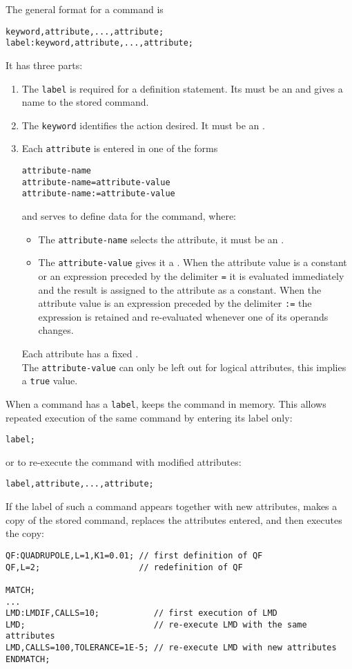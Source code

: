 The general format for a command is
\begin{verbatim}
keyword,attribute,...,attribute;
label:keyword,attribute,...,attribute;
\end{verbatim}
It has three parts:
\begin{enumerate}
\item The \texttt{label} is required for a definition statement.
  Its must be an  and gives a name to the
  stored command. 
\item The \texttt{keyword} identifies the action desired.
  It must be an .
\item Each \texttt{attribute} is entered in one of the forms
\begin{verbatim}
attribute-name
attribute-name=attribute-value
attribute-name:=attribute-value
\end{verbatim}
and serves to define data for the command, where:
\begin{itemize}
\item The \texttt{attribute-name} selects the attribute,
  it must be an .
\item The \texttt{attribute-value} gives it a .
  When the attribute value is a constant or an expression preceded by
  the delimiter \texttt{=} it is evaluated immediately and the result
  is assigned to the attribute as a constant.
  When the attribute value is an expression preceded by the delimiter
  \texttt{:=} the expression is retained and re-evaluated whenever one
  of its operands changes.
\end{itemize}
Each attribute has a fixed .\\
The \texttt{attribute-value} can only be left out for logical
attributes, this implies a \texttt{true} value.
\end{enumerate}

When a command has a \texttt{label},
\opal keeps the command in memory.
This allows repeated execution of the same command
by entering its label only:
\begin{verbatim}
label;
\end{verbatim}
or to re-execute the command with modified attributes:
\begin{verbatim}
label,attribute,...,attribute;
\end{verbatim}
If the label of such a command appears together with new attributes,
\opal makes a copy of the stored command, replaces the attributes entered,
and then executes the copy:
\begin{verbatim}
QF:QUADRUPOLE,L=1,K1=0.01; // first definition of QF
QF,L=2;                    // redefinition of QF

MATCH;
...
LMD:LMDIF,CALLS=10;           // first execution of LMD
LMD;                          // re-execute LMD with the same attributes
LMD,CALLS=100,TOLERANCE=1E-5; // re-execute LMD with new attributes
ENDMATCH;
\end{verbatim}

